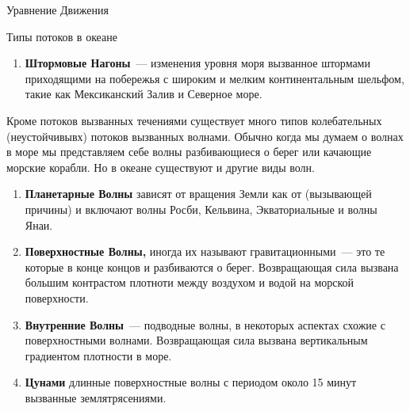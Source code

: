 \begin{chapter}{Уравнение Движения}
\begin{section}{Типы потоков в океане}
\begin{enumerate}
\item
\textbf{Штормовые Нагоны}~--- изменения уровня моря вызванное штормами
приходящими на побережья с широким и мелким континентальным шельфом,
такие как Мексиканский Залив и Северное море.
\end{enumerate}

Кроме потоков вызванных течениями существует много типов колебательных
(неустойчивывх) потоков вызванных волнами. Обычно когда мы думаем о
волнах в море мы представляем себе волны разбивающиеся о берег или
качающие морские корабли. Но в океане существуют и другие виды волн.
%
%
\begin{enumerate}
\item
\textbf{Планетарные Волны} зависят от вращения Земли как от
(вызывающей причины) и включают волны Росби, Кельвина, Экваториальные
и волны Янаи.
%

\item
\textbf{Поверхностные Волны,} иногда их называют гравитационными~---
это те которые в конце концов и разбиваются о берег. Возвращающая сила
вызвана большим контрастом плотноти между воздухом и водой на морской
поверхности.
%

\item
\textbf{Внутренние Волны}~--- подводные волны, в некоторых аспектах
схожие с поверхностными волнами. Возвращающая сила вызвана
вертикальным градиентом плотности в море.
%

\item
\textbf{Цунами} длинные поверхностные волны с периодом около 15 минут
вызванные землятрясениями.
%


\end{enumerate}
\end{section}
\end{chapter}
